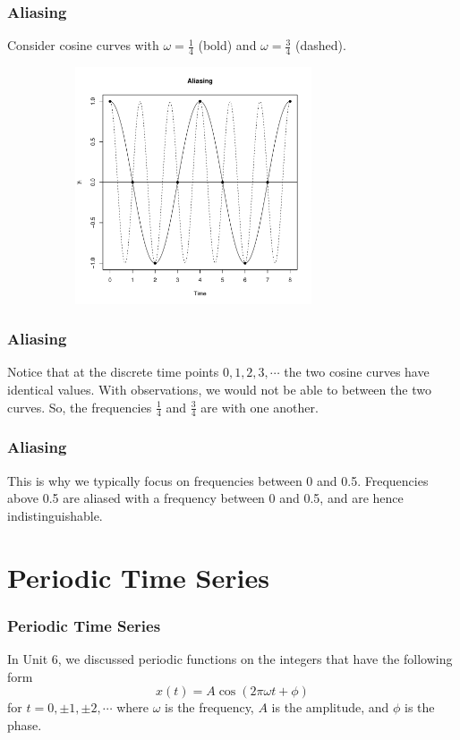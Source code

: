 \documentclass[%
xcolor=pdftex]{beamer}
\begin{document}
\begin{frame}
\frametitle{Aliasing}

Consider cosine curves with $\omega=\frac{1}{4}$ (bold) and $\omega=\frac{3}{4}$ (dashed).

\includegraphics[width=110mm, height=70mm]{alias.pdf}

\end{frame}

\begin{frame}
\frametitle{Aliasing}

Notice that at the discrete time points $0, 1, 2, 3, \cdots$ the two cosine curves have identical values. With \underline{\hspace{22 mm}} observations, we would not be able to \underline{\hspace{20 mm}} between the two curves. So, the frequencies $\frac{1}{4}$ and $\frac{3}{4}$ are \underline{\hspace{10 mm}} with one another.

\end{frame}

\begin{frame}
\frametitle{Aliasing}

This is why we typically focus on frequencies between 0 and 0.5. Frequencies above 0.5 are aliased with a frequency between 0 and 0.5, and are hence indistinguishable.

\end{frame}



\section{Periodic Time Series}
\frame{\tableofcontents[currentsection]}

\begin{frame}
\frametitle{Periodic Time Series}

In Unit 6, we discussed periodic functions on the integers that have the following form
$$
x(t)=A \cos(2 \pi \omega t +\phi)
$$
for $t=0, \pm 1, \pm 2, \cdots $ where $\omega$ is the frequency, $A$ is the amplitude, and $\phi$ is the phase.

\end{frame}
\end{document}
